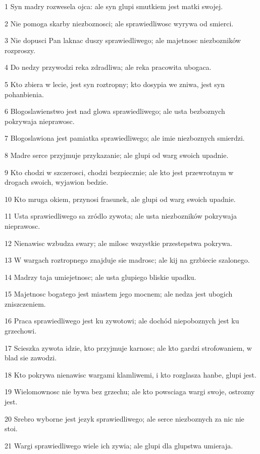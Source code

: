 \par 1 Syn madry rozwesela ojca: ale syn glupi smutkiem jest matki swojej.
\par 2 Nie pomoga skarby niezboznosci; ale sprawiedliwosc wyrywa od smierci.
\par 3 Nie dopusci Pan laknac duszy sprawiedliwego; ale majetnosc niezbozników rozproszy.
\par 4 Do nedzy przywodzi reka zdradliwa; ale reka pracowita ubogaca.
\par 5 Kto zbiera w lecie, jest syn roztropny; kto dosypia we zniwa, jest syn pohanbienia.
\par 6 Blogoslawienstwo jest nad glowa sprawiedliwego; ale usta bezboznych pokrywaja nieprawosc.
\par 7 Blogoslawiona jest pamiatka sprawiedliwego; ale imie niezboznych smierdzi.
\par 8 Madre serce przyjmuje przykazanie; ale glupi od warg swoich upadnie.
\par 9 Kto chodzi w szczerosci, chodzi bezpiecznie; ale kto jest przewrotnym w drogach swoich, wyjawion bedzie.
\par 10 Kto mruga okiem, przynosi frasunek, ale glupi od warg swoich upadnie.
\par 11 Usta sprawiedliwego sa zródlo zywota; ale usta niezbozników pokrywaja nieprawosc.
\par 12 Nienawisc wzbudza swary; ale milosc wszystkie przestepstwa pokrywa.
\par 13 W wargach roztropnego znajduje sie madrosc; ale kij na grzbiecie szalonego.
\par 14 Madrzy taja umiejetnosc; ale usta glupiego bliskie upadku.
\par 15 Majetnosc bogatego jest miastem jego mocnem; ale nedza jest ubogich zniszczeniem.
\par 16 Praca sprawiedliwego jest ku zywotowi; ale dochód niepoboznych jest ku grzechowi.
\par 17 Scieszka zywota idzie, kto przyjmuje karnosc; ale kto gardzi strofowaniem, w blad sie zawodzi.
\par 18 Kto pokrywa nienawisc wargami klamliwemi, i kto rozglasza hanbe, glupi jest.
\par 19 Wielomownosc nie bywa bez grzechu; ale kto powsciaga wargi swoje, ostrozny jest.
\par 20 Srebro wyborne jest jezyk sprawiedliwego; ale serce niezboznych za nic nie stoi.
\par 21 Wargi sprawiedliwego wiele ich zywia; ale glupi dla glupstwa umieraja.
